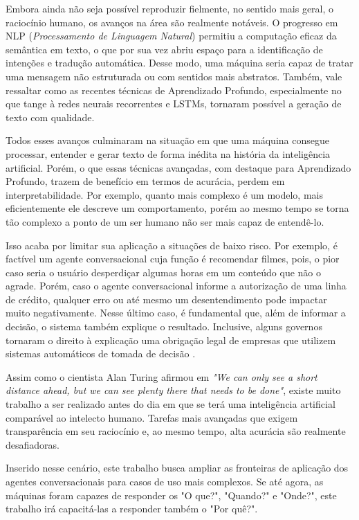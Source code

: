 \documentclass[]{politex}
\begin{document}
Embora ainda não seja possível reproduzir fielmente, no sentido mais geral, o raciocínio humano, os avanços na área são realmente notáveis. O progresso em NLP (\textit{Processamento de Linguagem Natural}) permitiu a computação eficaz da semântica em texto, o que por sua vez abriu espaço para a identificação de intenções e tradução automática. Desse modo, uma máquina seria capaz de tratar uma mensagem não estruturada ou com sentidos mais abstratos. Também, vale ressaltar como as recentes técnicas de Aprendizado Profundo, especialmente no que tange à redes neurais recorrentes e LSTMs, tornaram possível a geração de texto com qualidade.

Todos esses avanços culminaram na situação em que uma máquina consegue processar, entender e gerar texto de forma inédita na história da inteligência artificial. Porém, o que essas técnicas avançadas, com destaque para Aprendizado Profundo, trazem de benefício em termos de acurácia, perdem em interpretabilidade. Por exemplo, quanto mais complexo é um modelo, mais eficientemente ele descreve um comportamento, porém ao mesmo tempo se torna tão complexo a ponto de um ser humano não ser mais capaz de entendê-lo.

Isso acaba por limitar sua aplicação a situações de baixo risco. Por exemplo, é factível um agente conversacional cuja função é recomendar filmes, pois, o pior caso seria o usuário desperdiçar algumas horas em um conteúdo que não o agrade. Porém, caso o agente conversacional informe a autorização de uma linha de crédito, qualquer erro ou até mesmo um desentendimento pode impactar muito negativamente. Nesse último caso, é fundamental que, além de informar a decisão, o sistema também explique o resultado. Inclusive, alguns governos tornaram o direito à explicação uma obrigação legal de empresas que utilizem sistemas automáticos de tomada de decisão \cite{eu-269-2014}.

Assim como o cientista Alan Turing afirmou em \textit{"We can only see a short distance ahead, but we can see plenty there that needs to be done"}, existe muito trabalho a ser realizado antes do dia em que se terá uma inteligência artificial comparável ao intelecto humano. Tarefas mais avançadas que exigem transparência em seu raciocínio e, ao mesmo tempo, alta acurácia são realmente desafiadoras.  

Inserido nesse cenário, este trabalho busca ampliar as fronteiras de aplicação dos agentes conversacionais para casos de uso mais complexos. Se até agora, as máquinas foram capazes de responder os "O que?", "Quando?" e "Onde?", este trabalho irá capacitá-las a responder também o "Por quê?".
\end{document}
